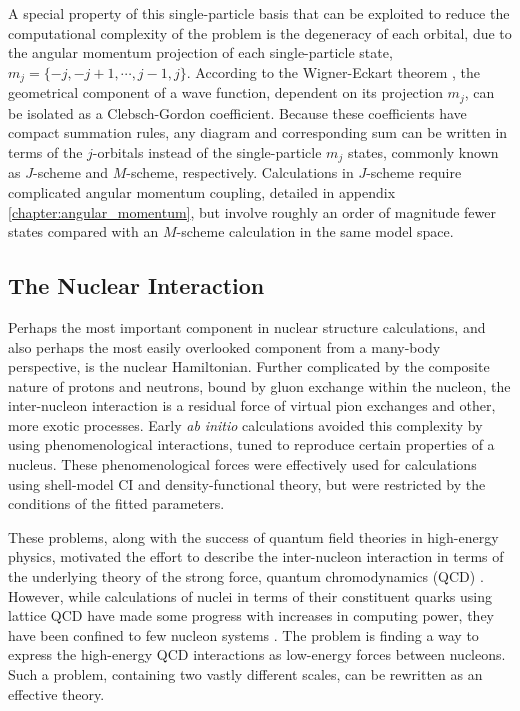 \documentclass[thesis.tex]{subfiles}
\begin{document}
A special property of this single-particle basis that can be exploited to reduce the computational complexity of the problem is the degeneracy of each orbital, due to the angular momentum projection of each single-particle state, $m_{j} = \{ -j, -j+1, \cdots , j-1, j \}$.  According to the Wigner-Eckart theorem \cite{WIGNER1959,ECKART1930}, the geometrical component of a wave function, dependent on its projection $m_{j}$, can be isolated as a Clebsch-Gordon coefficient.  Because these coefficients have compact summation rules, any diagram and corresponding sum can be written in terms of the $j$-orbitals instead of the single-particle $m_{j}$ states, commonly known as $J$-scheme and $M$-scheme, respectively.  Calculations in $J$-scheme require complicated angular momentum coupling, detailed in appendix \ref{chapter:angular_momentum}, but involve roughly an order of magnitude fewer states compared with an $M$-scheme calculation in the same model space.


\subsection{The Nuclear Interaction} \label{section:nuclear_interaction}

Perhaps the most important component in nuclear structure calculations, and also perhaps the most easily overlooked component from a many-body perspective, is the nuclear Hamiltonian.  Further complicated by the composite nature of protons and neutrons, bound by gluon exchange within the nucleon, the inter-nucleon interaction is a residual force of virtual pion exchanges and other, more exotic processes.  Early \emph{ab initio} calculations avoided this complexity by using phenomenological interactions, tuned to reproduce certain properties of a nucleus.  These phenomenological forces were effectively used for calculations using shell-model CI and density-functional theory, but were restricted by the conditions of the fitted parameters.

These problems, along with the success of quantum field theories in high-energy physics, motivated the effort to describe the inter-nucleon interaction in terms of the underlying theory of the strong force, quantum chromodynamics (QCD) \cite{HATSUDA1994221,LEPAGE1980}.  However, while calculations of nuclei in terms of their constituent quarks using lattice QCD have made some progress with increases in computing power, they have been confined to few nucleon systems \cite{BEANE2012}.  The problem is finding a way to express the high-energy QCD interactions as low-energy forces between nucleons.  Such a problem, containing two vastly different scales, can be rewritten as an effective theory.
\end{document}
